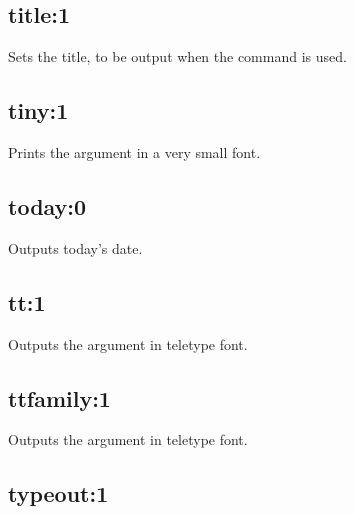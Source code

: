 
\subsection*{title:1}\label{title}

Sets the title, to be output when the command \rtfsp
is used.

\subsection*{tiny:1}\label{tiny}

Prints the argument in a very small font.

\subsection*{today:0}\label{today}

Outputs today's date.

\subsection*{tt:1}\label{tt}

Outputs the argument in teletype font.

\subsection*{ttfamily:1}\label{ttfamily}

Outputs the argument in teletype font.

\subsection*{typeout:1}\label{typeout}

